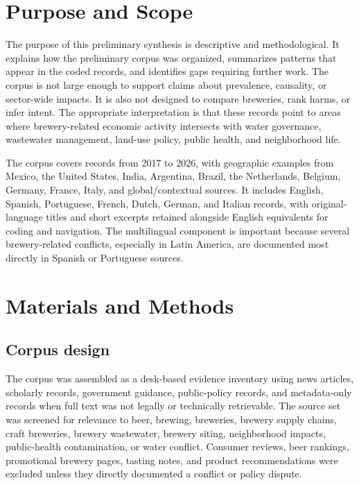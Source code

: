 \documentclass[man,12pt]{apa7}
\begin{document}
\section{Purpose and Scope}

The purpose of this preliminary synthesis is descriptive and methodological. It explains how the preliminary corpus was organized, summarizes patterns that appear in the coded records, and identifies gaps requiring further work. The corpus is not large enough to support claims about prevalence, causality, or sector-wide impacts. It is also not designed to compare breweries, rank harms, or infer intent. The appropriate interpretation is that these records point to areas where brewery-related economic activity intersects with water governance, wastewater management, land-use policy, public health, and neighborhood life.

The corpus covers records from 2017 to 2026, with geographic examples from Mexico, the United States, India, Argentina, Brazil, the Netherlands, Belgium, Germany, France, Italy, and global/contextual sources. It includes English, Spanish, Portuguese, French, Dutch, German, and Italian records, with original-language titles and short excerpts retained alongside English equivalents for coding and navigation. The multilingual component is important because several brewery-related conflicts, especially in Latin America, are documented most directly in Spanish or Portuguese sources.

\section{Materials and Methods}

\subsection{Corpus design}

The corpus was assembled as a desk-based evidence inventory using news articles, scholarly records, government guidance, public-policy records, and metadata-only records when full text was not legally or technically retrievable. The source set was screened for relevance to beer, brewing, breweries, brewery supply chains, craft breweries, brewery wastewater, brewery siting, neighborhood impacts, public-health contamination, or water conflict. Consumer reviews, beer rankings, promotional brewery pages, tasting notes, and product recommendations were excluded unless they directly documented a conflict or policy dispute.
\end{document}
